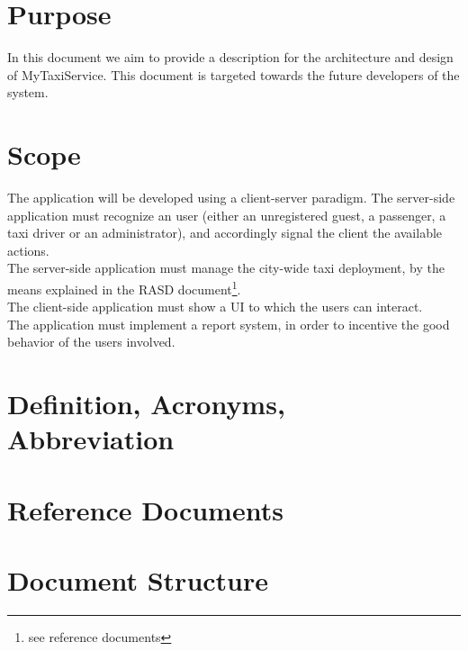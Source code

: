 \section{Purpose}
In this document we aim to provide a description for the architecture and design of MyTaxiService.
This document is targeted towards the future developers of the system.

\section{Scope}
The application will be developed using a client-server paradigm.
The server-side application must recognize an user (either an unregistered guest, a passenger, a taxi driver or an administrator), 
and accordingly signal the client the available actions. \\
The server-side application must manage the city-wide taxi deployment, by the means explained in the RASD 
document\footnote{see reference documents}. \\ The client-side application must show a UI to which the users can interact. \\
The application must implement a report system, in order to incentive the good behavior of the users involved.

\section{Definition, Acronyms, Abbreviation}


\section{Reference Documents}

\section{Document Structure}

